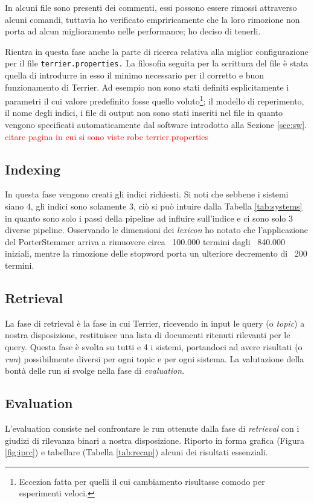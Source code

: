 \documentclass[letterpaper, 10 pt, conference]{ieeeconf}  %
\newcommand\todo[1]{\textcolor{red}{#1}}
\begin{document}
In alcuni file sono presenti dei commenti, essi possono essere rimossi attraverso alcuni comandi, tuttavia ho verificato empriricamente che la loro rimozione non porta ad alcun miglioramento nelle performance; ho deciso di tenerli.

Rientra in questa fase anche la parte di ricerca relativa alla miglior configurazione per il file \texttt{terrier.properties.} La filosofia seguita per la scrittura del file è stata quella di introdurre in esso il minimo necessario per il corretto e buon funzionamento di Terrier. Ad esempio non sono stati definiti esplicitamente i parametri il cui valore predefinito fosse quello voluto\footnote{Eccezion fatta per quelli il cui cambiamento risultasse comodo per esperimenti veloci.}; il modello di reperimento, il nome degli indici, i file di output non sono stati inseriti nel file in quanto vengono specificati automaticamente dal software introdotto alla Sezione \ref{sec:sw}. \todo{citare pagina in cui si sono viste robe terrier.properties}

\subsection{Indexing}\label{subsec:index}
In questa fase vengono creati gli indici richiesti. Si noti che sebbene i sistemi siano 4, gli indici sono solamente 3, ciò si può intuire dalla Tabella \ref{tab:systems} in quanto sono solo i passi della pipeline ad influire sull'indice e ci sono solo 3 diverse pipeline. Osservando le dimensioni dei \textit{lexicon} ho notato che l'applicazione del PorterStemmer arriva a rimuovere circa ~100.000 termini dagli ~840.000 iniziali, mentre la rimozione delle stopword porta un ulteriore decremento di ~200 termini.



\subsection{Retrieval}
La fase di retrieval è la fase in cui Terrier, ricevendo in input le query (o \textit{topic}) a nostra disposizione, restituisce una lista di documenti ritenuti rilevanti per le query. Questa fase è svolta su tutti e 4 i sistemi, portandoci ad avere risultati (o \textit{run}) possibilmente diversi per ogni topic e per ogni sistema. La valutazione della bontà delle run si svolge nella fase di \textit{evaluation}.
\subsection{Evaluation}
\label{subsec:eval}
L'evaluation consiste nel confrontare le run ottenute dalla fase di \textit{retrieval} con i giudizi di rilevanza binari a nostra disposizione. Riporto in forma grafica (Figura \ref{fig:iprc}) e tabellare (Tabella \ref{tab:recap}) alcuni dei risultati essenziali.
\end{document}
